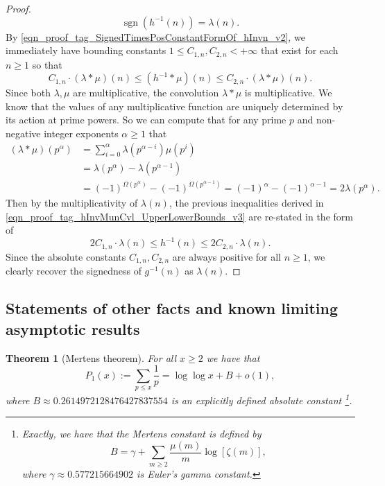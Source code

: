 \documentclass[11pt,reqno,a4letter]{article}
\numberwithin{figure}{section}
\numberwithin{table}{section}
\theoremstyle{plain}
\newtheorem{theorem}{Theorem}
\numberwithin{theorem}{section}
\theoremstyle{definition}
\begin{document}
\begin{proof}
\begin{equation} 
\label{eqn_proof_tag_SignedTimesPosConstantFormOf_hInvn_v2}
\operatorname{sgn}(h^{-1}(n)) = \lambda(n). 
\end{equation}
By \eqref{eqn_proof_tag_SignedTimesPosConstantFormOf_hInvn_v2}, we immediately have bounding constants 
$1 \leq C_{1,n}, C_{2,n} < +\infty$ that exist for each $n \geq 1$ so that 
\begin{equation} 
\label{eqn_proof_tag_hInvMunCvl_UpperLowerBounds_v3} 
C_{1,n} \cdot (\lambda \ast \mu)(n) \leq (h^{-1} \ast \mu)(n) \leq C_{2,n} \cdot (\lambda \ast \mu)(n). 
\end{equation} 
Since both $\lambda,\mu$ are multiplicative, the convolution $\lambda \ast \mu$ is multiplicative. 
We know that the values of 
any multiplicative function are uniquely determined by its action at prime powers. 
So we can compute that for any prime $p$ and non-negative integer exponents $\alpha \geq 1$ that 
\begin{align*} 
(\lambda \ast \mu)(p^{\alpha}) & = \sum_{i=0}^{\alpha} \lambda(p^{\alpha-i}) \mu(p^{i}) \\ 
     & = \lambda(p^{\alpha}) - \lambda(p^{\alpha-1}) \\ 
     & = 
     (-1)^{\Omega(p^{\alpha})} - (-1)^{\Omega(p^{\alpha-1})} = 
     (-1)^{\alpha} - (-1)^{\alpha-1} = 
     2 \lambda(p^{\alpha}). 
\end{align*} 
Then by the multiplicativity of $\lambda(n)$, the previous inequalities derived in 
\eqref{eqn_proof_tag_hInvMunCvl_UpperLowerBounds_v3} are re-stated in the form of 
\[
2 C_{1,n} \cdot \lambda(n) \leq h^{-1}(n) \leq 2 C_{2,n} \cdot \lambda(n). 
\] 
Since the absolute constants $C_{1,n}, C_{2,n}$ are always positive for all $n \geq 1$, 
we clearly recover the signedness of $g^{-1}(n)$ as $\lambda(n)$. 
\end{proof} 

\subsection{Statements of other facts and known limiting asymptotic results} 
\label{subSection_OtherFactsAndResults} 

\begin{theorem}[Mertens theorem]
\label{theorem_Mertens_theorem} 
For all $x \geq 2$ we have that 
\[
P_1(x) := \sum_{p \leq x} \frac{1}{p} = \log\log x + B + o(1), 
\]
where 
$B \approx 0.2614972128476427837554$ 
is an explicitly defined absolute constant \footnote{ 
     Exactly, we have that the \emph{Mertens constant} is defined by 
     \[
     B = \gamma + \sum_{m \geq 2} \frac{\mu(m)}{m} \log\left[\zeta(m)\right], 
     \]
     where $\gamma \approx 0.577215664902$ is Euler's gamma constant. 
}.
\end{theorem} 
\end{document}
